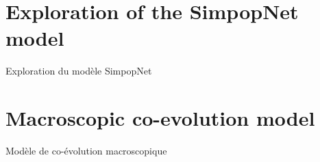 






\newpage

\section{Exploration of the SimpopNet model}{Exploration du modèle SimpopNet}

\label{app:sec:macrocoevolexplo}

















\newpage

\section{Macroscopic co-evolution model}{Modèle de co-évolution macroscopique}

\label{app:sec:macrocoevol}






